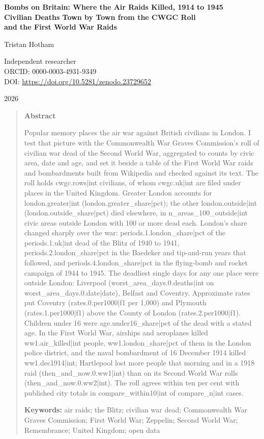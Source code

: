 \documentclass[11pt,a4paper]{article}
\begin{document}
\begin{center}
{\Large\bfseries Bombs on Britain: Where the Air Raids Killed, 1914 to 1945\\[2pt] Civilian Deaths Town by Town from the CWGC Roll\\[2pt] and the First World War Raids\par}
\vspace{1.2em}
{\large Tristan Hotham\par}
\vspace{0.3em}
{\small Independent researcher\\
ORCID: 0000-0003-4931-9349\\
DOI: \href{https://doi.org/10.5281/zenodo.23729652}{https://doi.org/10.5281/zenodo.23729652}\par}
\vspace{0.8em}
2026
\end{center}

\begin{quote}
\small
\begin{center}\textbf{Abstract}\end{center}
Popular memory places the air war against British civilians in London. I test that picture with the Commonwealth War Graves Commission's roll of civilian war dead of the Second World War, aggregated to counts by civic area, date and age, and set it beside a table of the First World War raids and bombardments built from Wikipedia and checked against its text. The roll holds {{cwgc.rows|int}} civilians, of whom {{cwgc.uk|int}} are filed under places in the United Kingdom. Greater London accounts for {{london.greater|int}} ({{london.greater_share|pct}}); the other {{london.outside|int}} ({{london.outside_share|pct}}) died elsewhere, in {{n_areas_100_outside|int}} civic areas outside London with 100 or more dead each. London's share changed sharply over the war: {{periods.1.london_share|pct}} of the {{periods.1.uk|int}} dead of the Blitz of 1940 to 1941, {{periods.2.london_share|pct}} in the Baedeker and tip-and-run years that followed, and {{periods.4.london_share|pct}} in the flying-bomb and rocket campaign of 1944 to 1945. The deadliest single days for any one place were outside London: Liverpool ({{worst_area_days.0.deaths|int}} on {{worst_area_days.0.date|date}}), Belfast and Coventry. Approximate rates put Coventry ({{rates.0.per1000|f1}} per 1,000) and Plymouth ({{rates.1.per1000|f1}}) above the County of London ({{rates.2.per1000|f1}}). Children under 16 were {{age.under16_share|pct}} of the dead with a stated age. In the First World War, airships and aeroplanes killed {{ww1.air_killed|int}} people, {{ww1.london_share|pct}} of them in the London police district, and the naval bombardment of 16 December 1914 killed {{ww1.dec1914|int}}; Hartlepool lost more people that morning and in a 1918 raid ({{then_and_now.0.ww1|int}}) than on its Second World War rolls ({{then_and_now.0.ww2|int}}). The roll agrees within ten per cent with published city totals in {{compare_within10|int}} of {{compare_n|int}} cases.

\textbf{Keywords:} air raids; the Blitz; civilian war dead; Commonwealth War Graves Commission; First World War; Zeppelin; Second World War; Remembrance; United Kingdom; open data
\end{quote}
\end{document}
